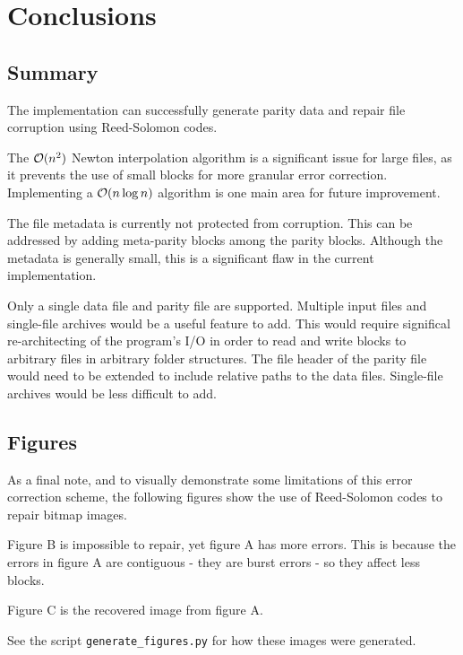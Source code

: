 \chapter{Conclusions}

\section{Summary}

The implementation can successfully generate parity data and repair file corruption using Reed-Solomon codes.

The $\mathcal{O}(n^2)$ Newton interpolation algorithm is a significant issue for large files, as it prevents the use of small blocks for more granular error correction.
Implementing a $\mathcal{O}(n \log n)$ algorithm is one main area for future improvement. \cite{6979016-novel-basis}

The file metadata is currently not protected from corruption.
This can be addressed by adding meta-parity blocks among the parity blocks.
Although the metadata is generally small, this is a significant flaw in the current implementation.

Only a single data file and parity file are supported. Multiple input files and single-file archives would be a useful feature to add.
This would require significal re-architecting of the program's I/O in order to read and write blocks to arbitrary files in arbitrary folder structures.
The file header of the parity file would need to be extended to include relative paths to the data files.
Single-file archives would be less difficult to add.

\pagebreak

\section{Figures}

As a final note, and to visually demonstrate some limitations of this error correction scheme,
the following figures show the use of Reed-Solomon codes to repair bitmap images.

Figure B is impossible to repair, yet figure A has more errors.
This is because the errors in figure A are contiguous - they are burst errors - so they affect less blocks.

Figure C is the recovered image from figure A.

See the script \texttt{generate\_figures.py} for how these images were generated.

